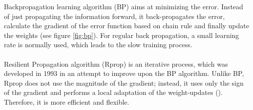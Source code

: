 \documentclass[a4paper,reqno,]{article}
\begin{document}
Backpropagation learning algorithm (BP) aims at minimizing the error. Instead of just propagating the information forward, it back-propagates the error, calculate the gradient of the error function based on chain rule and finally update the weights (see figure \ref{fig:bp}). For regular back propagation, a small learning rate is normally used, which leads to the slow training process.
\\\\Resilient Propagation algorithm (Rprop) is an iterative process, which was developed in 1993 in an attempt to improve upon the BP algorithm. Unlike BP, Rprop  does not use the magnitude of the gradient; instead, it uses only the sign of the gradient and performs a local adaptation of the weight-updates (\cite{riedmiller1993direct}). Therefore, it is more efficient and flexible.
\end{document}
